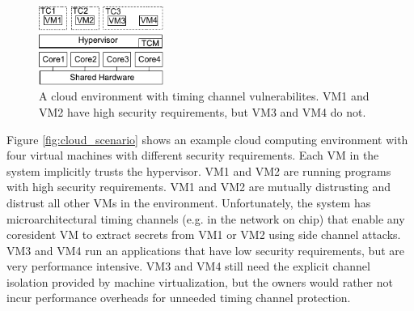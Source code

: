    \begin{figure}
        \begin{center}
            \includegraphics[width=1.6in]{figs/cloud_tcs.pdf}
            \caption{A cloud environment with timing channel vulnerabilites. 
             VM1 and VM2 have high security requirements, but VM3 and VM4 do 
             not.}
            \label{fig:cloud_tcs}
        \end{center}
    \end{figure}

Figure \ref{fig:cloud_scenario} shows an example cloud computing environment 
with four virtual machines with different security requirements. Each VM in the 
system implicitly trusts the hypervisor. VM1 and VM2 
are running programs with high security requirements. VM1 and VM2 are mutually 
distrusting and distrust all other VMs in the environment. Unfortunately, the 
system has microarchitectural timing channels (e.g. in the network on chip) 
that enable any coresident VM to extract secrets from VM1 or VM2 using side 
channel attacks. VM3 and VM4 run an applications that have low security 
requirements, but are very performance intensive. VM3 and VM4 still need the 
explicit channel isolation provided by machine virtualization, but the owners 
would rather not incur performance overheads for unneeded timing channel 
protection.

